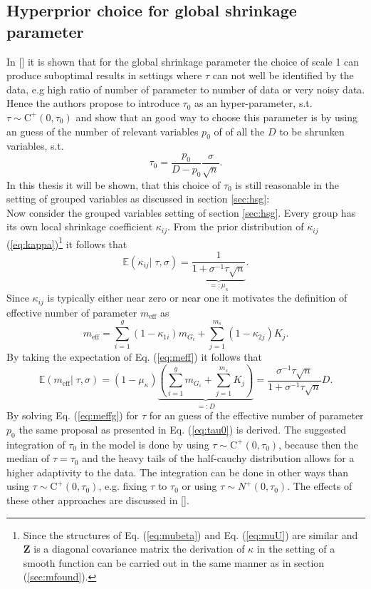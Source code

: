 \documentclass[12pt,letterpaper]{article}
\numberwithin{equation}{subsection}
\begin{document}
\subsection{Hyperprior choice for global shrinkage parameter}
\label{sec:opt}
In [\cite{horseshoe}] it is shown that for the global shrinkage parameter the choice of scale 1 can produce suboptimal results  in settings where $\tau$ can not well be identified by the data, e.g high ratio of number of parameter to number of data or very noisy data. Hence the authors propose to introduce $\tau_0$ as an hyper-parameter, s.t. $\tau \sim \text{C}^+(0,\tau_0)$ and show that an good way to choose this parameter is by using an guess of the number of relevant variables $p_0$ of of all the $D$ to be shrunken variables, s.t.
\begin{equation}
\tau_0 = \frac{p_0}{D-p_0}\frac{\sigma}{\sqrt{n}}.
\label{eq:tau0}
\end{equation}
In this thesis it will be shown, that this choice of $\tau_0$ is still reasonable in the setting of grouped variables as discussed in section \ref{sec:hsg}: \\
Now consider the grouped variables setting of section \ref{sec:hsg}. 
Every group has its own local shrinkage coefficient $\kappa_{ij}$.
From the prior distribution of $\kappa_{ij}$ (\ref{eq:kappa})\footnote{Since the structures of Eq. (\ref{eq:mubeta}) and Eq. (\ref{eq:muU}) are similar and $\mathbf{Z}$ is a diagonal covariance matrix the derivation of $\kappa$ in the setting of a smooth function can be carried out in the same manner as in section (\ref{sec:mfound}).} it follows that
\begin{equation}
\mathbb{E}(\kappa_{ij}|\; \tau, \sigma) = \underbrace{\frac{1}{1+\sigma^{-1}\tau\sqrt{n}}}_{=:\mu_\kappa}.
\end{equation}
Since $\kappa_{ij}$ is typically either near zero or near one it motivates the definition of effective number of parameter $m_{\text{eff}}$ as 
\begin{equation}
m_{\text{eff}} = \sum^g_{i=1}(1-\kappa_{1i})m_{G_i} + \sum^{m_s}_{j=1}(1-\kappa_{2j})K_j.
\label{eq:meff}
\end{equation}
By taking the expectation of Eq. (\ref{eq:meff}) it follows that
\begin{equation}
\mathbb{E}(m_{\text{eff}}|\; \tau, \sigma) = (1-\mu_\kappa)\underbrace{( \sum^g_{i=1}m_{G_i} + \sum^{m_s}_{j=1}K_j)}_{=: D} = \frac{\sigma^{-1}\tau\sqrt{n}}{1+\sigma^{-1}\tau\sqrt{n}}D.
\label{eq:meffg}
\end{equation}
By solving Eq. (\ref{eq:meffg}) for $\tau$ for an guess of the effective number of parameter $p_0$ the same proposal as presented in Eq. (\ref{eq:tau0}) is derived. The suggested integration of $\tau_0$ in the model is done by using $\tau \sim \text{C}^+(0, \tau_0)$, because then the median of $\tau = \tau_0$ and the heavy tails of the half-cauchy distribution allows for a higher adaptivity to the data. The integration can be done in other ways than using $\tau \sim \text{C}^+(0,\tau_0)$, e.g. fixing $\tau$ to $\tau_0$ or using $\tau \sim N^+(0,\tau_0)$. The effects of these other approaches are discussed in [\cite{horseshoe}].
\end{document}
